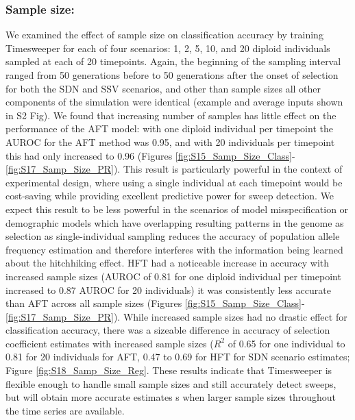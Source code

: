 \subsubsection{Sample size:} We examined the effect of sample size on classification accuracy by training Timesweeper for each of four scenarios: 1, 2, 5, 10, and 20 diploid individuals sampled at each of 20 timepoints. Again, the beginning of the sampling interval ranged from 50 generations before to 50 generations after the onset of selection for both the SDN and SSV scenarios, and other than sample sizes all other components of the simulation were identical (example and average inputs shown in S2 Fig). We found that increasing number of samples has little effect on the performance of the AFT model: with one diploid individual per timepoint the AUROC for the AFT method was 0.95, and with 20 individuals per timepoint this had only increased to 0.96 (Figures \ref{fig:S15_Samp_Size_Class}-\ref{fig:S17_Samp_Size_PR}). This result is particularly powerful in the context of experimental design, where using a single individual at each timepoint would be cost-saving while providing excellent predictive power for sweep detection. We expect this result to be less powerful in the scenarios of model misspecification or demographic models which have overlapping resulting patterns in the genome as selection as single-individual sampling reduces the accuracy of population allele frequency estimation and therefore interferes with the information being learned about the hitchhiking effect. HFT had a noticeable increase in accuracy with increased sample sizes (AUROC of 0.81 for one diploid individual per timepoint increased to 0.87 AUROC for 20 individuals) it was consistently less accurate than AFT across all sample sizes (Figures \ref{fig:S15_Samp_Size_Class}-\ref{fig:S17_Samp_Size_PR}).
While increased sample sizes had no drastic effect for classification accuracy, there was a sizeable difference in accuracy of selection coefficient estimates with increased sample sizes ($R^2$ of 0.65 for one individual to 0.81 for 20 individuals for AFT, 0.47 to 0.69 for HFT for SDN scenario estimates; Figure \ref{fig:S18_Samp_Size_Reg}. These results indicate that Timesweeper is flexible enough to handle small sample sizes and still accurately detect sweeps, but will obtain more accurate estimates s when larger sample sizes throughout the time series are available. \\


